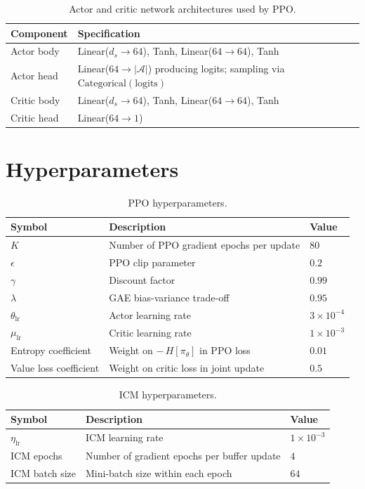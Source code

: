 \begin{table}[H]
\centering
\caption{Actor and critic network architectures used by PPO.}
\label{tab:ppo_arch}
\begin{tabular}{|l|l|}
\hline
\textbf{Component} & \textbf{Specification} \\
\hline
Actor body & Linear($d_s \to 64$), Tanh, Linear($64 \to 64$), Tanh \\
\hline
Actor head & Linear($64 \to |\mathcal{A}|$) producing logits; sampling via $\text{Categorical}(\text{logits})$ \\
\hline
Critic body & Linear($d_s \to 64$), Tanh, Linear($64 \to 64$), Tanh \\
\hline
Critic head & Linear($64 \to 1$) \\
\hline
\end{tabular}
\end{table}

\section{Hyperparameters}
\label{app:hyperparameters}

\begin{table}[H]
\centering
\caption{PPO hyperparameters.}
\label{tab:ppo_hparams}
\begin{tabular}{|l|l|l|}
\hline
\textbf{Symbol} & \textbf{Description} & \textbf{Value} \\
\hline
$K$ & Number of PPO gradient epochs per update & $80$ \\
\hline
$\epsilon$ & PPO clip parameter & $0.2$ \\
\hline
$\gamma$ & Discount factor & $0.99$ \\
\hline
$\lambda$ & GAE bias-variance trade-off & $0.95$ \\
\hline
$\theta_\text{lr}$ & Actor learning rate & $3 \times 10^{-4}$ \\
\hline
$\mu_\text{lr}$ & Critic learning rate & $1 \times 10^{-3}$ \\
\hline
Entropy coefficient & Weight on $-\,H[\pi_\theta]$ in PPO loss & $0.01$ \\
\hline
Value loss coefficient & Weight on critic loss in joint update & $0.5$ \\
\hline
\end{tabular}
\end{table}

\begin{table}[H]
\centering
\caption{ICM hyperparameters.}
\label{tab:icm_hparams}
\begin{tabular}{|l|l|l|}
\hline
\textbf{Symbol} & \textbf{Description} & \textbf{Value} \\
\hline
$\eta_\text{lr}$ & ICM learning rate & $1 \times 10^{-3}$ \\
\hline
ICM epochs & Number of gradient epochs per buffer update & $4$ \\
\hline
ICM batch size & Mini-batch size within each epoch & $64$ \\
\hline
\end{tabular}
\end{table}

